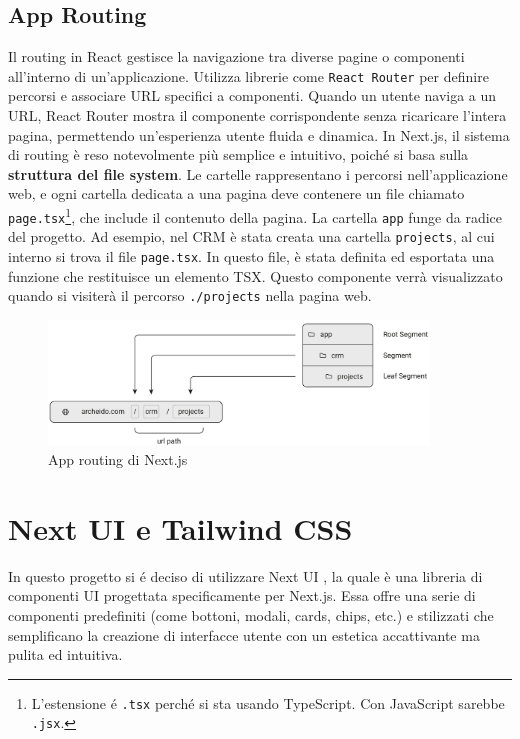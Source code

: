 \documentclass[target=bach,aauheader=,style=]{thud}
\begin{document}
\subsection{App Routing}
Il routing in React gestisce la navigazione tra diverse pagine o componenti all'interno di un'applicazione. Utilizza librerie come \texttt{React Router} per definire percorsi e associare URL specifici a componenti. Quando un utente naviga a un URL, React Router mostra il componente corrispondente senza ricaricare l'intera pagina, permettendo un'esperienza utente fluida e dinamica. In Next.js, il sistema di routing è reso notevolmente più semplice e intuitivo, poiché si basa sulla \textbf{struttura del file system}. Le cartelle rappresentano i percorsi nell'applicazione web, e ogni cartella dedicata a una pagina deve contenere un file chiamato \texttt{page.tsx}\footnote{L'estensione é \texttt{.tsx} perché si sta usando TypeScript. Con JavaScript sarebbe \texttt{.jsx}.}, che include il contenuto della pagina. La cartella \texttt{app} funge da radice del progetto. Ad esempio, nel CRM è stata creata una cartella \texttt{projects}, al cui interno si trova il file \texttt{page.tsx}. In questo file, è stata definita ed esportata una funzione che restituisce un elemento TSX. Questo componente verrà visualizzato quando si visiterà il percorso \texttt{./projects} nella pagina web.

\begin{figure}[htbp]
    \centering
    \vspace{0.8cm} 
    \includegraphics[width=0.9\textwidth]{img/routing.pdf} 
    \caption{App routing \cite{nextjsdocs2024} di Next.js}
\end{figure}



\section{Next UI e Tailwind CSS}
In questo progetto si é deciso di utilizzare Next UI \cite{nextui2024}, la quale è una libreria di componenti UI progettata specificamente per Next.js. Essa offre una serie di componenti predefiniti (come bottoni, modali, cards, chips, etc.) e stilizzati che semplificano la creazione di interfacce utente con un estetica accattivante ma pulita ed intuitiva. 
\end{document}
